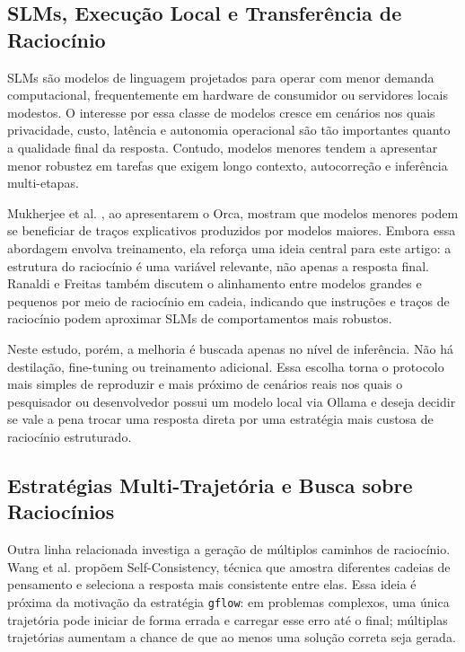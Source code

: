 \documentclass[12pt]{article}
\begin{document}
\subsection{SLMs, Execução Local e Transferência de Raciocínio}

SLMs são modelos de linguagem projetados para operar com menor demanda computacional, frequentemente em hardware de consumidor ou servidores locais modestos. O interesse por essa classe de modelos cresce em cenários nos quais privacidade, custo, latência e autonomia operacional são tão importantes quanto a qualidade final da resposta. Contudo, modelos menores tendem a apresentar menor robustez em tarefas que exigem longo contexto, autocorreção e inferência multi-etapas.

Mukherjee et al. \cite{mukherjee2023}, ao apresentarem o Orca, mostram que modelos menores podem se beneficiar de traços explicativos produzidos por modelos maiores. Embora essa abordagem envolva treinamento, ela reforça uma ideia central para este artigo: a estrutura do raciocínio é uma variável relevante, não apenas a resposta final. Ranaldi e Freitas \cite{ranaldi2024} também discutem o alinhamento entre modelos grandes e pequenos por meio de raciocínio em cadeia, indicando que instruções e traços de raciocínio podem aproximar SLMs de comportamentos mais robustos.

Neste estudo, porém, a melhoria é buscada apenas no nível de inferência. Não há destilação, fine-tuning ou treinamento adicional. Essa escolha torna o protocolo mais simples de reproduzir e mais próximo de cenários reais nos quais o pesquisador ou desenvolvedor possui um modelo local via Ollama e deseja decidir se vale a pena trocar uma resposta direta por uma estratégia mais custosa de raciocínio estruturado.

\subsection{Estratégias Multi-Trajetória e Busca sobre Raciocínios}

Outra linha relacionada investiga a geração de múltiplos caminhos de raciocínio. Wang et al. \cite{wang2022selfconsistency} propõem Self-Consistency, técnica que amostra diferentes cadeias de pensamento e seleciona a resposta mais consistente entre elas. Essa ideia é próxima da motivação da estratégia \texttt{gflow}: em problemas complexos, uma única trajetória pode iniciar de forma errada e carregar esse erro até o final; múltiplas trajetórias aumentam a chance de que ao menos uma solução correta seja gerada.
\end{document}
